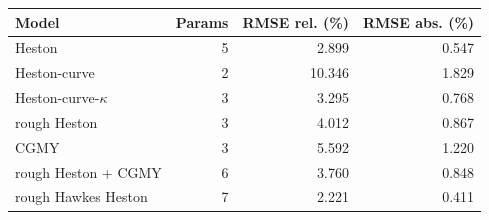 \begin{tabular}{lrrr}
\toprule
Model & Params & RMSE rel. (\%) & RMSE abs. (\%)\\
\midrule
Heston & 5 & 2.899 & 0.547\\
Heston-curve & 2 & 10.346 & 1.829\\
Heston-curve-$\kappa$ & 3 & 3.295 & 0.768\\
rough Heston & 3 & 4.012 & 0.867\\
CGMY & 3 & 5.592 & 1.220\\
rough Heston + CGMY & 6 & 3.760 & 0.848\\
rough Hawkes Heston & 7 & 2.221 & 0.411\\
\bottomrule
\end{tabular}
